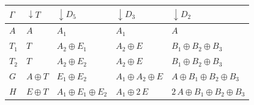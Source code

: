 \begin{tabular}{lllll}
\hline
$\Gamma$ & $\downarrow T$ & $\downarrow D_5$ & $\downarrow D_3$ & $\downarrow D_2$ \\
\hline
$A$ & $A$ & $A_1$ & $A_1$ & $A$ \\
$T_1$ & $T$ & $A_2 \oplus E_1$ & $A_2 \oplus E$ & $B_1 \oplus B_2 \oplus B_3$ \\
$T_2$ & $T$ & $A_2 \oplus E_2$ & $A_2 \oplus E$ & $B_1 \oplus B_2 \oplus B_3$ \\
$G$ & $A \oplus T$ & $E_1 \oplus E_2$ & $A_1 \oplus A_2 \oplus E$ & $A \oplus B_1 \oplus B_2 \oplus B_3$ \\
$H$ & $E \oplus T$ & $A_1 \oplus E_1 \oplus E_2$ & $A_1 \oplus 2\,E$ & $2\,A \oplus B_1 \oplus B_2 \oplus B_3$ \\
\hline
\end{tabular}
